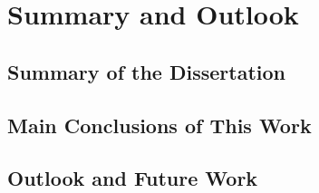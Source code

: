\chapter{Summary and Outlook}

\section{Summary of the Dissertation}

\section{Main Conclusions of This Work}

\section{Outlook and Future Work}
